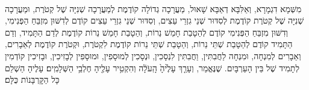\documentclass[twoside, openany, parskip=half, 11pt]{book}
\begin{document}

\tamid
\\
\ketoret



  מִשְּׁמָא דִגְמָרָא, וְאַלִּבָּא דְאַבָּא שָׁאוּל, מַעֲרָכָה גְדוֹלָה קוֹדֶמֶת לְמַעֲרָכָה שְׁנִיָּה שֶׁל קְטֹרֶת, וּמַעֲרָכָה שְׁנִיָּה שֶׁל קְטֹרֶת קוֹדֶמֶת לְסִדּוּר שְׁנֵי גִזְרֵי עֵצִים, וְסִדּוּר שְׁנֵי גִזְרֵי עֵצִים קוֹדֶם לְדִשּׁוּן מִזְבֵּחַ הַפְּנִימִי, וְדִשּׁוּן מִזְבֵּחַ הַפְּנִימִי קוֹדֶם לְהַטָבַת חָמֵשׁ נֵרוֹת, וְהַטָבַת חָמֵשׁ נֵרוֹת קוֹדֶמֶת לְדַם הַתָּמִיד, וְדַם הַתָּמִיד קוֹדֶם לְהַטָבַת שְׁתֵּי נֵרוֹת, וְהַטָבַת שְׁתֵּי נֵרוֹת קוֹדֶמֶת לִקְטֹרֶת, וּקְטֹרֶת קוֹדֶמֶת לְאֵבָרִים, וְאֵבָרִים לְמִנְחָה, וּמִנְחָה לַחֲבִתִּין, וַחֲבִתִּין לִנְסָכִין, וּנְסָכִין לְמוּסָפִין, וּמוּסָפִין לְבָזִיכִין, וּבָזִיכִין קוֹדְמִין לְתָמִיד שֶׁל בֵּין הָעַרְבָּיִם. שֶׁנֶּאֱמַר, וְעָרַ֤ךְ  עָלֶ֙יהָ֙ הָֽעֹלָ֔ה וְהִקְטִ֥יר עָלֶ֖יהָ חֶלְבֵ֥י הַשְּׁלָמִֽים׃ עָלֶיהָ הַשְׁלֵם כָּל הַקׇּרְבָּנוֹת כֻּלָּם׃
\end{document}
